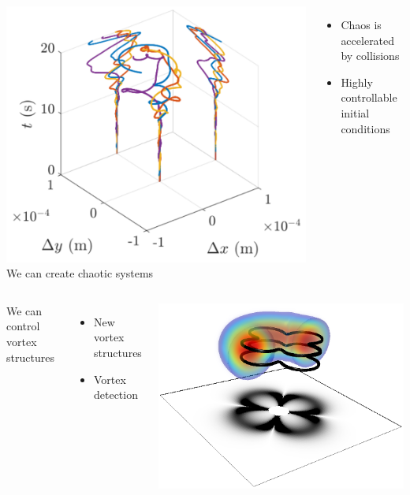 \documentclass{beamer}
\begin{document}
\begin{frame}
\pause
\begin{columns}
\includegraphics[width=\textwidth]{../data/2d/evolution/evolution}
We can create chaotic systems
\begin{itemize}
\item Chaos is accelerated by collisions
\item Highly controllable initial conditions
\end{itemize}
\end{columns}

\pause
\begin{columns}
We can control vortex structures
\begin{itemize}
\item New vortex structures
\item Vortex detection
\end{itemize}
\includegraphics[width=\textwidth]{../data/3d/HE21_3d}
\end{columns}

\end{frame}
\end{document}
